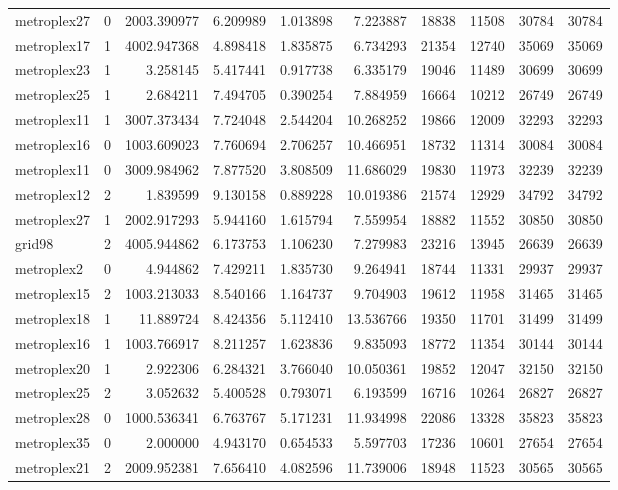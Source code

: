 \begin{longtable}{|l|r|r|r|r|r|r|r|r|r|}
metroplex27 & 0 & 2003.390977 & 6.209989 & 1.013898 & 7.223887 & 18838 & 11508 & 30784 & 30784 \\
metroplex17 & 1 & 4002.947368 & 4.898418 & 1.835875 & 6.734293 & 21354 & 12740 & 35069 & 35069 \\
metroplex23 & 1 & 3.258145 & 5.417441 & 0.917738 & 6.335179 & 19046 & 11489 & 30699 & 30699 \\
metroplex25 & 1 & 2.684211 & 7.494705 & 0.390254 & 7.884959 & 16664 & 10212 & 26749 & 26749 \\
metroplex11 & 1 & 3007.373434 & 7.724048 & 2.544204 & 10.268252 & 19866 & 12009 & 32293 & 32293 \\
metroplex16 & 0 & 1003.609023 & 7.760694 & 2.706257 & 10.466951 & 18732 & 11314 & 30084 & 30084 \\
metroplex11 & 0 & 3009.984962 & 7.877520 & 3.808509 & 11.686029 & 19830 & 11973 & 32239 & 32239 \\
metroplex12 & 2 & 1.839599 & 9.130158 & 0.889228 & 10.019386 & 21574 & 12929 & 34792 & 34792 \\
metroplex27 & 1 & 2002.917293 & 5.944160 & 1.615794 & 7.559954 & 18882 & 11552 & 30850 & 30850 \\
grid98 & 2 & 4005.944862 & 6.173753 & 1.106230 & 7.279983 & 23216 & 13945 & 26639 & 26639 \\
metroplex2 & 0 & 4.944862 & 7.429211 & 1.835730 & 9.264941 & 18744 & 11331 & 29937 & 29937 \\
metroplex15 & 2 & 1003.213033 & 8.540166 & 1.164737 & 9.704903 & 19612 & 11958 & 31465 & 31465 \\
metroplex18 & 1 & 11.889724 & 8.424356 & 5.112410 & 13.536766 & 19350 & 11701 & 31499 & 31499 \\
metroplex16 & 1 & 1003.766917 & 8.211257 & 1.623836 & 9.835093 & 18772 & 11354 & 30144 & 30144 \\
metroplex20 & 1 & 2.922306 & 6.284321 & 3.766040 & 10.050361 & 19852 & 12047 & 32150 & 32150 \\
metroplex25 & 2 & 3.052632 & 5.400528 & 0.793071 & 6.193599 & 16716 & 10264 & 26827 & 26827 \\
metroplex28 & 0 & 1000.536341 & 6.763767 & 5.171231 & 11.934998 & 22086 & 13328 & 35823 & 35823 \\
metroplex35 & 0 & 2.000000 & 4.943170 & 0.654533 & 5.597703 & 17236 & 10601 & 27654 & 27654 \\
metroplex21 & 2 & 2009.952381 & 7.656410 & 4.082596 & 11.739006 & 18948 & 11523 & 30565 & 30565 \\

\end{longtable}
